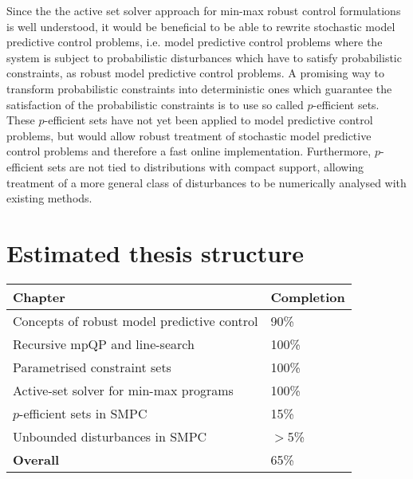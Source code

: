 \documentclass[a4paper,12pt]{scrartcl}
\begin{document}
Since the the active set solver approach for min-max robust control formulations is well understood, it would be beneficial
to be able to rewrite stochastic model predictive control problems, i.e. model predictive control problems where the system
is subject to probabilistic disturbances which have to satisfy probabilistic constraints, as robust model predictive control
problems.
%
A promising way to transform probabilistic constraints into deterministic ones which guarantee the satisfaction of the probabilistic
constraints is to use so called $p$-efficient sets.
%
These $p$-efficient sets have not yet been applied to model predictive control problems, but would allow robust treatment of stochastic
model predictive control problems and therefore a fast online implementation.
%
Furthermore, $p$-efficient sets are not tied to distributions with compact support, allowing treatment of a more general class of
disturbances to be numerically analysed with existing methods.
\pagebreak

\section*{Estimated thesis structure}

\setcounter{subsection}{1}

\singlespacing
\begin{tabular}{|p{}|p{}|}
\hline
\textbf{Chapter} & \textbf{Completion}\hfill \\
\hline\hline
Concepts of robust model predictive control & 90\% \\
\hline 
Recursive mpQP and line-search & 100\% \\
\hline
Parametrised constraint sets & 100\% \\
\hline
Active-set solver for min-max programs & 100\% \\
\hline
$p$-efficient sets in SMPC & 15\% \\
\hline
Unbounded disturbances in SMPC & $>$5\% \\
\hline\hline
\textbf{Overall} & 65\% \\ \hline
\end{tabular}

\doublespacing
\end{document}
